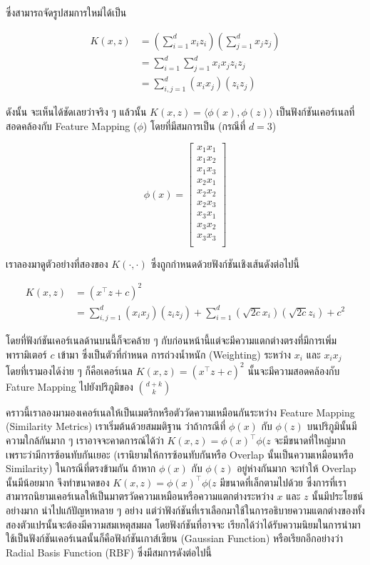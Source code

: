 \noindent ซึ่งสามารถจัดรูปสมการใหม่ได้เป็น

\begin{align}
    K(x,z) &= \left( \sum_{i=1}^d x_i z_i \right) \left( \sum_{j=1}^d x_j z_j \right)\\
    &= \sum_{i=1}^d \sum_{j=1}^d x_i x_j z_i z_j\\
    &= \sum_{i,j=1}^d (x_i x_j)(z_i z_j)
\end{align}

\noindent ดังนั้น จะเห็นได้ชัดเลยว่าจริง ๆ แล้วนั้น $K(x,z) = \langle\phi(x),\phi(z)\rangle$ เป็นฟังก์ชันเคอร์เนลที่สอดคล้องกับ
Feature Mapping ($\phi$) โดยที่มีสมการเป็น (กรณีที่ $d = 3$)

\begin{equation}
    \phi(x) = \begin{bmatrix}
    x_1 x_1\\
    x_1 x_2\\
    x_1 x_3\\
    x_2 x_1\\
    x_2 x_2\\
    x_2 x_3\\
    x_3 x_1\\
    x_3 x_2\\
    x_3 x_3\\
    \end{bmatrix}
\end{equation}

เราลองมาดูตัวอย่างที่สองของ $K(\cdot,\cdot)$ ซึ่งถูกกำหนดด้วยฟังก์ชันเชิงเส้นดังต่อไปนี้

\begin{align}
    K(x,z) &= (x^{\top} z + c)^2\\
    &= \sum_{i,j=1}^d (x_i x_j)(z_i z_j) + \sum_{i=1}^d \left(\sqrt{2c}x_i\right) \left(\sqrt{2c}z_i\right) + c^2
\end{align}

\noindent โดยที่ฟังก์ชันเคอร์เนลด้านบนนี้ก็จะคล้าย ๆ กับก่อนหน้านี้แต่จะมีความแตกต่างตรงที่มีการเพิ่มพารามิเตอร์ $c$ เข้ามา ซึ่งเป็นตัวที่กำหนด%
การถ่วงน้ำหนัก (Weighting) ระหว่าง $x_{i}$ และ $x_{i}x_{j}$ โดยที่เรามองได้ง่าย ๆ ก็คือเคอร์เนล $K(x,z) = (x^{\top} z + c)^2$
นั้นจะมีความสอดคล้องกับ Fature Mapping ไปยังปริภูมิของ $\binom{d+k}{k}$

คราวนี้เราลองมามองเคอร์เนลให้เป็นเมตริกหรือตัววัดความเหมือนกันระหว่าง Feature Mapping (Similarity Metrics) เราเริ่มต้นด้วยสมมติฐาน%
ว่าถ้ากรณีที่ $\phi(x)$ กับ $\phi(z)$ บนปริภูมินั้นมีความใกล้กันมาก ๆ เราอาจจะคาดการณ์ได้ว่า $K(x,z) = \phi(x)^{\top} \phi(z$
จะมีขนาดที่ใหญ่มากเพราะว่ามีการซ้อนทับกันเยอะ (เรานิยามให้การซ้อนทับกันหรือ Overlap นั้นเป็นความเหมือนหรือ Similarity) ในกรณีที่ตรงข้ามกัน
ถ้าหาก $\phi(x)$ กับ $\phi(z)$ อยู่ห่างกันมาก จะทำให้ Overlap นั้นมีน้อยมาก จึงทำขนาดของ $K(x,z) = \phi(x)^{\top} \phi(z$ 
มีขนาดที่เล็กตามไปด้วย ซึ่งการที่เราสามารถนิยามเคอร์เนลให้เป็นมาตรวัดความเหมือนหรือความแตกต่างระหว่าง $x$ และ $z$ นั้นมีประโยชน์อย่างมาก%
นำไปแก้ปัญหาหลาย ๆ อย่าง แต่ว่าฟังก์ชันที่เราเลือกมาใช้ในการอธิบายความแตกต่างของทั้งสองตัวแปรนั้นจะต้องมีความสมเหตุสมผล โดยฟังก์ชันที่อาจจะ%
เรียกได้ว่าได้รับความนิยมในการนำมาใช้เป็นฟังก์ชันเคอร์เนลนั้นก็คือฟังก์ชันเกาส์เซียน (Gaussian Function) หรือเรียกอีกอย่างว่า Radial Basis
Function (RBF) ซึ่งมีสมการดังต่อไปนี้ 

